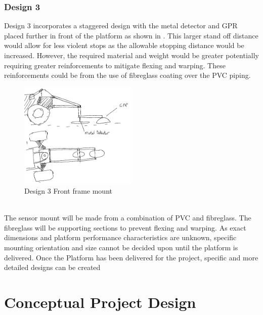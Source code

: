 \documentclass[main.tex]{subfiles}
\begin{document}
\subsubsection{Design 3}
Design 3 incorporates a staggered design with the metal detector and GPR placed further in front of the platform as shown in . This larger stand off distance would allow for less violent stops as the allowable stopping distance would be increased. However, the required material and weight would be greater potentially requiring greater reinforcements to mitigate flexing and warping. These reinforcements could be from the use of fibreglass coating over the PVC piping.
\begin{figure}[ht]
\includegraphics[width=0.5\textwidth]{4-ConceptDesign/front_mount_staggered.png}
\centering
\caption{Design 3 Front frame mount}
\end{figure}\\

The sensor mount will be made from a combination of PVC and fibreglass. The fibreglass will be supporting sections to prevent flexing and warping. As exact dimensions and platform performance characteristics are unknown, specific mounting orientation and size cannot be decided upon until the platform is delivered. Once the Platform has been delivered for the project, specific and more detailed designs can be created

\section{Conceptual Project Design}
\end{document}
